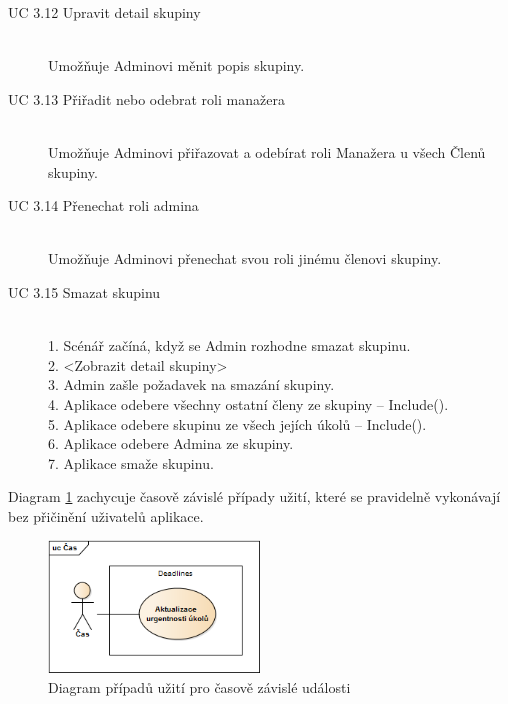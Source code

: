 \documentclass[thesis=B,czech]{FITthesis}[2012/06/26]
\begin{document}
\begin{description}
				\item[UC 3.12 Upravit detail skupiny] \hfill \\
					Umožňuje Adminovi měnit popis skupiny.
				
				\item[UC 3.13 Přiřadit nebo odebrat roli manažera] \hfill \\
					Umožňuje Adminovi přiřazovat a odebírat roli Manažera u všech Členů skupiny.
					
				\item[UC 3.14 Přenechat roli admina] \hfill \\
					Umožňuje Adminovi přenechat svou roli jinému členovi skupiny.
					
				\item[UC 3.15 Smazat skupinu] \hfill \\
					1. Scénář začíná, když se Admin rozhodne smazat skupinu. \\
					2. <Zobrazit detail skupiny>\\
					3. Admin zašle požadavek na smazání skupiny. \\
					4. Aplikace odebere všechny ostatní členy ze skupiny -- Include(). \\
					5. Aplikace odebere skupinu ze všech jejích úkolů -- Include(). \\
					6. Aplikace odebere Admina ze skupiny. \\
					7. Aplikace smaže skupinu. \\
					
			\end{description}
				
				
			
			Diagram \ref{diagram:uc-time} zachycuje časově závislé případy užití, které se pravidelně vykonávají bez přičinění uživatelů aplikace.
			\begin{figure}\centering
				\includegraphics[width=0.5\textwidth]{ea-diagrams/uc-time.png}
				\caption[Případy užití časových událostí]{Diagram případů užití pro časově závislé události}
				\label{diagram:uc-time}
			\end{figure}
			
\end{document}
